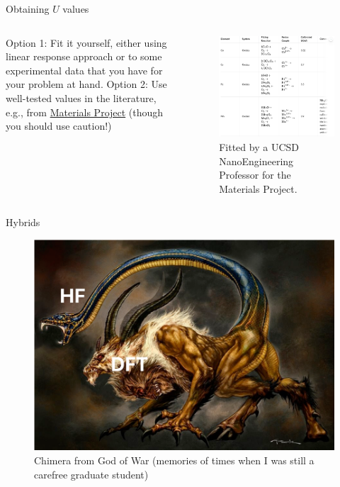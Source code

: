 \documentclass[aspectratio=169]{beamer}
\begin{document}
\begin{frame}{Obtaining $U$ values}
\begin{columns}
Option 1: Fit it yourself, either using linear response approach or to some experimental data that you have for your problem at hand.\newline
\newline
Option 2: Use well-tested values in the literature, e.g., from \href{https://docs.materialsproject.org/methodology/materials-methodology/calculation-details/gga+u-calculations/hubbard-u-values}{Materials Project} (though you should use caution!)

\begin{figure}
    \centering
    \includegraphics[width=0.9\linewidth]{lectures/figures/6_mp_u_values.png}
    \caption{Fitted by a UCSD NanoEngineering Professor for the Materials Project.}
\end{figure}
\end{columns} 

\end{frame} 


\begin{frame}{Hybrids}
\begin{figure}
    \centering
    \includegraphics[width=0.5\linewidth]{lectures/figures/6_chimera.png}
    \caption{Chimera from God of War (memories of times when I was still a carefree graduate student)}
\end{figure}
\end{frame} 
\end{document}

